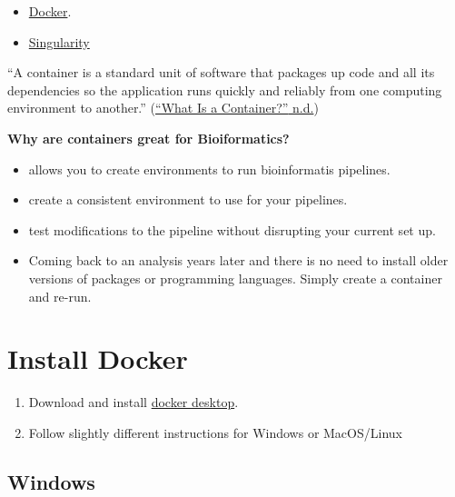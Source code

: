 \documentclass[
]{book}
\providecommand{\tightlist}{%
  \setlength{\itemsep}{0pt}\setlength{\parskip}{0pt}}
\begin{document}
\begin{itemize}
\tightlist
\item
  \href{https://www.docker.com/}{Docker}.
\item
  \href{https://sylabs.io/}{Singularity}
\end{itemize}

``A container is a standard unit of software that packages up code and all its dependencies so the application runs quickly and reliably from one computing environment to another.'' (\protect\hyperlink{ref-docker}{{``What Is a Container?''} n.d.})

\textbf{Why are containers great for Bioiformatics?}

\begin{itemize}
\tightlist
\item
  allows you to create environments to run bioinformatis pipelines.
\item
  create a consistent environment to use for your pipelines.
\item
  test modifications to the pipeline without disrupting your current set up.
\item
  Coming back to an analysis years later and there is no need to install older versions of packages or programming languages. Simply create a container and re-run.
\end{itemize}

\hypertarget{install-docker}{%
\section{Install Docker}\label{install-docker}}

\begin{enumerate}
\def\labelenumi{\arabic{enumi}.}
\tightlist
\item
  Download and install \href{https://www.docker.com/products/docker-desktop}{docker desktop}.
\item
  Follow slightly different instructions for Windows or MacOS/Linux
\end{enumerate}

\hypertarget{windows}{%
\subsection{Windows}\label{windows}}
\end{document}
